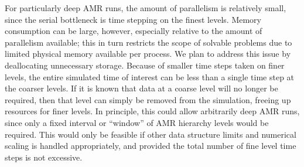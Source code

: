 \documentclass[11pt,letterpaper]{article}
\begin{document}






For particularly deep AMR runs, the amount of parallelism is
relatively small, since the serial bottleneck is time stepping on the
finest levels.  Memory consumption can be large, however, especially
relative to the amount of parallelism available; this in turn
restricts the scope of solvable problems due to limited physical
memory available per process.  We plan to address this issue by
deallocating unnecessary storage.  Because of smaller time steps taken
on finer levels, the entire simulated time of interest can be less
than a single time step at the coarser levels.  If it is known that
data at a coarse level will no longer be required, then that level can
simply be removed from the simulation, freeing up resources for finer
levels.  In principle, this could allow arbitrarily deep AMR runs,
since only a fixed interval or ``window'' of AMR hierarchy levels
would be required.  This would only be feasible if other data
structure limits and numerical scaling is handled appropriately, and
provided the total number of fine level time steps is not excessive.
\end{document}
